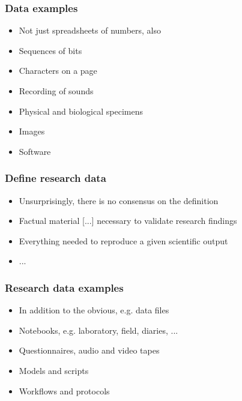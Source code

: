 \documentclass{beamer}
\begin{document}
\begin{frame}
  \frametitle{Data examples}
  
  \begin{itemize}
  \item Not just spreadsheets of numbers, also
  \item Sequences of bits
  \item Characters on a page
  \item Recording of sounds
  \item Physical and biological specimens
  \item Images
  \item Software
  \end{itemize}
\end{frame}

\begin{frame}
  \frametitle{Define research data}
  
  \begin{itemize}
  \item Unsurprisingly, there is no consensus on the definition
  \item Factual material [...] necessary to validate research findings \cite{epsrc17researchdata}
  \item Everything needed to reproduce a given scientific output \cite{surkis15researchdata}
  \item ...
  \end{itemize}
\end{frame}

\begin{frame}
  \frametitle{Research data examples}
  
  \begin{itemize}
  \item In addition to the obvious, e.g. data files
  \item Notebooks, e.g. laboratory, field, diaries, ...
  \item Questionnaires, audio and video tapes
  \item Models and scripts
  \item Workflows and protocols
  \end{itemize}
\end{frame}
\end{document}
